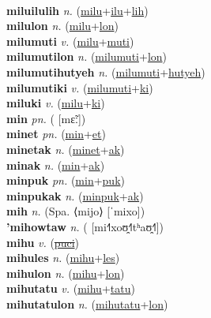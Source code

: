  \label{milu} \\
\textbf{miluilulih} \textit{n.} (\hyperref[milu]{milu}+\hyperref[ilu]{ilu}+\hyperref[lih]{lih})
 \label{miluilulih} \\
\textbf{milulon} \textit{n.} (\hyperref[milu]{milu}+\hyperref[lon]{lon})
 \label{milulon} \\
\textbf{milumuti} \textit{v.} (\hyperref[milu]{milu}+\hyperref[muti]{muti})
 \label{milumuti} \\
\textbf{milumutilon} \textit{n.} (\hyperref[milumuti]{milumuti}+\hyperref[lon]{lon})
 \label{milumutilon} \\
\textbf{milumutihutyeh} \textit{n.} (\hyperref[milumuti]{milumuti}+\hyperref[hutyeh]{hutyeh})
 \label{milumutihutyeh} \\
\textbf{milumutiki} \textit{v.} (\hyperref[milumuti]{milumuti}+\hyperref[ki]{ki})
 \label{milumutiki} \\
\textbf{miluki} \textit{v.} (\hyperref[milu]{milu}+\hyperref[ki]{ki})
 \label{miluki} \\
\textbf{min} \textit{pn.} ( [mɛ̃ː])
 \label{min} \\
\textbf{minet} \textit{pn.} (\hyperref[min]{min}+\hyperref[et]{et})
 \label{minet} \\
\textbf{minetak} \textit{n.} (\hyperref[minet]{minet}+\hyperref[ak]{ak})
 \label{minetak} \\
\textbf{minak} \textit{n.} (\hyperref[min]{min}+\hyperref[ak]{ak})
 \label{minak} \\
\textbf{minpuk} \textit{pn.} (\hyperref[min]{min}+\hyperref[puk]{puk})
 \label{minpuk} \\
\textbf{minpukak} \textit{n.} (\hyperref[minpuk]{minpuk}+\hyperref[ak]{ak})
 \label{minpukak} \\
\textbf{mih} \textit{n.} (Spa. ⟨mijo⟩ [ˈmixo])
 \label{mih} \\
\textbf{'mihowtaw} \textit{n.} ( [mi˧˥xoʊ̯˧˥tʰaʊ̯˧˥])
 \label{'mihowtaw} \\
\textbf{mihu} \textit{v.} (\hyperref[puci]{\sout{puci}})
 \label{mihu} \\
\textbf{mihules} \textit{n.} (\hyperref[mihu]{mihu}+\hyperref[les]{les})
 \label{mihules} \\
\textbf{mihulon} \textit{n.} (\hyperref[mihu]{mihu}+\hyperref[lon]{lon})
 \label{mihulon} \\
\textbf{mihutatu} \textit{v.} (\hyperref[mihu]{mihu}+\hyperref[tatu]{tatu})
 \label{mihutatu} \\
\textbf{mihutatulon} \textit{n.} (\hyperref[mihutatu]{mihutatu}+\hyperref[lon]{lon})
